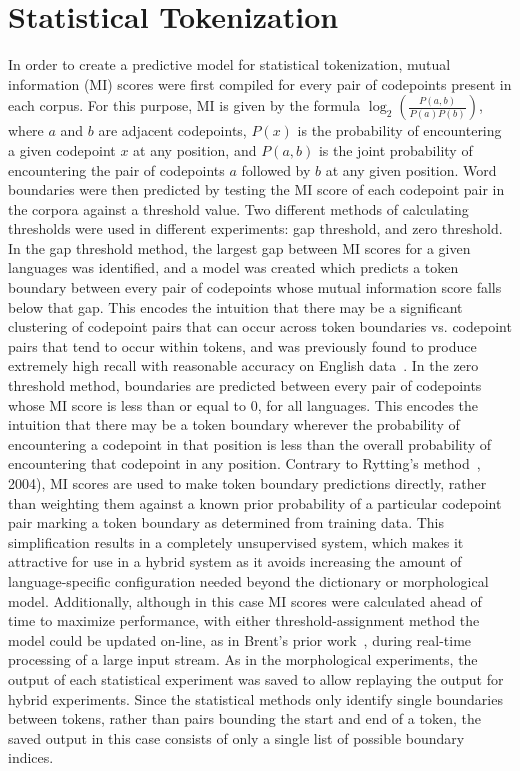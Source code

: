 \section{Statistical Tokenization}
In order to create a predictive model for statistical tokenization, mutual information (MI) scores were first compiled for every pair of codepoints present in each corpus. For this purpose, MI is given by the formula $\log_2(\frac{P(a,b)}{P(a)P(b)})$, where $a$ and $b$ are adjacent codepoints, $P(x)$ is the probability of encountering a given codepoint $x$ at any position, and $P(a,b)$ is the joint probability of encountering the pair of codepoints $a$ followed by $b$ at any given position. Word boundaries were then predicted by testing the MI score of each codepoint pair in the corpora against a threshold value.
Two different methods of calculating thresholds were used in different experiments: gap threshold, and zero threshold. In the gap threshold method, the largest gap between MI scores for a given languages was identified, and a model was created which predicts a token boundary between every pair of codepoints whose mutual information score falls below that gap. This encodes the intuition that there may be a significant clustering of codepoint pairs that can occur across token boundaries vs. codepoint pairs that tend to occur within tokens, and was previously found to produce extremely high recall with reasonable accuracy on English data~\cite{kearsley14}. In the zero threshold method, boundaries are predicted between every pair of codepoints whose MI score is less than or equal to 0, for all languages. This encodes the intuition that there may be a token boundary wherever the probability of encountering a codepoint in that position is less than the overall probability of encountering that codepoint in any position.
Contrary to Rytting's method~\cite{rytting04}, 2004), MI scores are used to make token boundary predictions directly, rather than weighting them against a known prior probability of a particular codepoint pair marking a token boundary as determined from training data. This simplification results in a completely unsupervised system, which makes it attractive for use in a hybrid system as it avoids increasing the amount of language-specific configuration needed beyond the dictionary or morphological model. Additionally, although in this case MI scores were calculated ahead of time to maximize performance, with either threshold-assignment method the model could be updated on-line, as in Brent's prior work~\cite{brent99}, during real-time processing of a large input stream.
As in the morphological experiments, the output of each statistical experiment was saved to allow replaying the output for hybrid experiments. Since the statistical methods only identify single boundaries between tokens, rather than pairs bounding the start and end of a token, the saved output in this case consists of only a single list of possible boundary indices.

